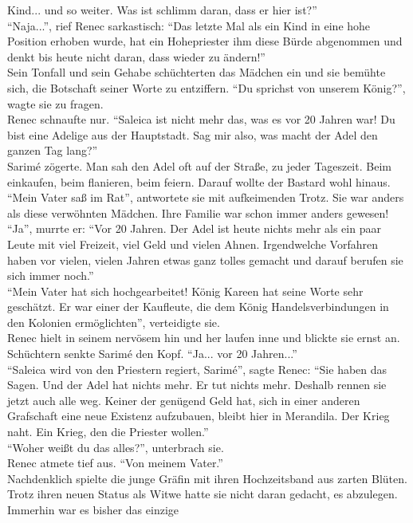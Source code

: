 Kind... und so weiter. Was ist schlimm daran, dass er hier ist?''\\
``Naja...'', rief Renec sarkastisch: ``Das letzte Mal als ein Kind in eine hohe Position erhoben 
wurde, hat ein Hohepriester ihm diese Bürde abgenommen und denkt bis heute nicht daran, dass wieder 
zu ändern!''\\
Sein Tonfall und sein Gehabe schüchterten das Mädchen ein und sie bemühte sich, die Botschaft 
seiner Worte zu entziffern. ``Du sprichst von unserem König?'', wagte sie zu fragen.\\
Renec schnaufte nur. ``Saleica ist nicht mehr das, was es vor 20 Jahren war! Du bist eine Adelige 
aus der Hauptstadt. Sag mir also, was macht der Adel den ganzen Tag lang?''\\
Sarimé zögerte. Man sah den Adel oft auf der Straße, zu jeder Tageszeit. Beim einkaufen, beim 
flanieren, beim feiern. Darauf wollte der Bastard wohl hinaus. ``Mein Vater saß im Rat'', 
antwortete sie mit aufkeimenden Trotz. Sie war anders als diese verwöhnten Mädchen. Ihre Familie 
war schon immer anders gewesen!\\
``Ja'', murrte er: ``Vor 20 Jahren. Der Adel ist heute nichts mehr als ein paar Leute mit viel 
Freizeit, viel Geld und vielen Ahnen. Irgendwelche Vorfahren haben vor vielen, vielen Jahren etwas 
ganz tolles gemacht und darauf berufen sie sich immer noch.''\\
``Mein Vater hat sich hochgearbeitet! König Kareen hat seine Worte sehr geschätzt. Er war einer der 
Kaufleute, die dem König Handelsverbindungen in den Kolonien ermöglichten'', verteidigte sie.\\
Renec hielt in seinem nervösem hin und her laufen inne und blickte sie ernst an. Schüchtern senkte 
Sarimé den Kopf. ``Ja... vor 20 Jahren...''\\
``Saleica wird von den Priestern regiert, Sarimé'', sagte Renec: ``Sie haben das Sagen. Und der 
Adel hat nichts mehr. Er tut nichts mehr. Deshalb rennen sie jetzt auch alle weg. Keiner der 
genügend Geld hat, sich in einer anderen Grafschaft eine neue Existenz aufzubauen, bleibt hier in 
Merandila. Der Krieg naht. Ein Krieg, den die Priester wollen.''\\
``Woher weißt du das alles?'', unterbrach sie.\\
Renec atmete tief aus. ``Von meinem Vater.''\\
Nachdenklich spielte die junge Gräfin mit ihren Hochzeitsband aus zarten Blüten. Trotz ihren neuen 
Status als Witwe hatte sie nicht daran gedacht, es abzulegen. Immerhin war es bisher das einzige 
